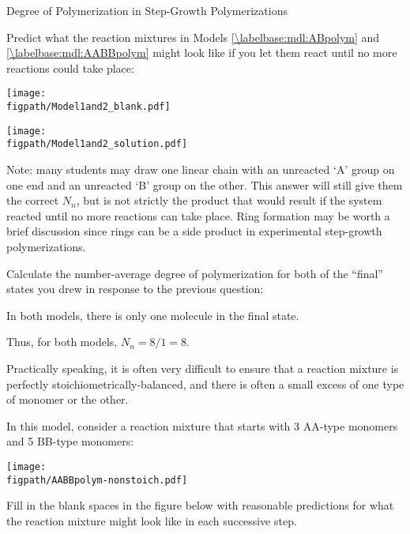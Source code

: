 \begin{activity}{Degree of Polymerization in Step-Growth Polymerizations}
\begin{ctqs}
		\question Predict what the reaction mixtures in Models \ref{\labelbase:mdl:ABpolym} and \ref{\labelbase:mdl:AABBpolym} might look like if you let them react until no more reactions could take place:
		
	\begin{solution}[2in]{\centerline{\texttt{[image: \\figpath/Model1and2\_blank.pdf]}}}
		\centerline{\texttt{[image: \\figpath/Model1and2\_solution.pdf]}}
		
		Note: many students may draw one linear chain with an unreacted `A' group on one end and an unreacted `B' group on the other. This answer will still give them the correct $N_n$, but is not strictly the product that would result if the system reacted until no more reactions can take place.  Ring formation may be worth a brief discussion since rings can be a side product in experimental step-growth polymerizations.
	
	\end{solution}
		
		\question Calculate the number-average degree of polymerization for both of the ``final'' states you drew in response to the previous question:
		
		\begin{solution}[1in]{}
			In both models, there is only one molecule in the final state.
			
			Thus, for both models, $N_n = 8/1 = 8$.
		\end{solution}
\end{ctqs}

\begin{model}
\label{\labelbase:mdl:stoichimbalance}

Practically speaking, it is often very difficult to ensure that a reaction mixture is perfectly stoichiometrically-balanced, and there is often a small excess of one type of monomer or the other.

In this model, consider a reaction mixture that starts with 3 AA-type monomers and 5 BB-type monomers:

\vspace{0.1in}
\centerline{\texttt{[image: \\figpath/AABBpolym-nonstoich.pdf]}}

\end{model}

\begin{ctqs}

		\question Fill in the blank spaces in the figure below with reasonable predictions for what the reaction mixture might look like in each successive step.
		

\end{ctqs}
\end{activity}

